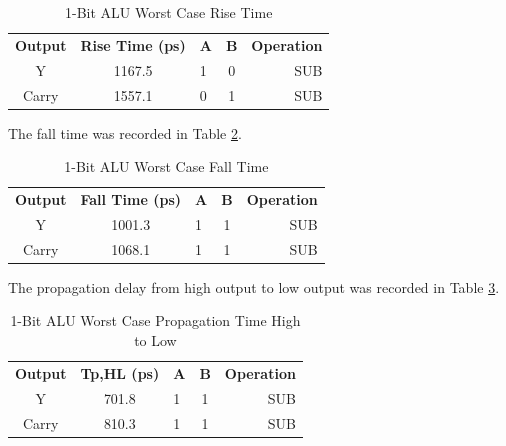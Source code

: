 \documentclass[11pt]{article}
\begin{document}
			\begin{table}[H]
				\centering
				\caption{1-Bit ALU Worst Case Rise Time}
				\label{tab:ALU-1-Bit-Risetime}
				\begin{tabular}{|cclcr|}
					\hline
					\textbf{Output} & \textbf{Rise Time (ps)} & \textbf{A} & \textbf{B} & \textbf{Operation} \\
					Y               & 1167.5                  & 1          & 0          & SUB                \\
					Carry           & 1557.1                  & 0          & 1          & SUB                \\
					         \hline
				\end{tabular}
			\end{table}
		
			The fall time was recorded in Table \ref{tab:ALU-1-Bit-Falltime}.
		
			\begin{table}[H]
				\centering
				\caption{1-Bit ALU Worst Case Fall Time}
				\label{tab:ALU-1-Bit-Falltime}
				\begin{tabular}{|cclcr|}
					\hline
					\textbf{Output} & \textbf{Fall Time (ps)} & \textbf{A} & \textbf{B} & \textbf{Operation} \\
					Y               & 1001.3                  & 1          & 1          & SUB                \\
					Carry           & 1068.1                  & 1          & 1          & SUB                \\
					\hline
				\end{tabular}
			\end{table}
		
			The propagation delay from high output to low output was recorded in Table \ref{tab:ALU-1-Bit-Tpd-HL}.
		
			\begin{table}[H]
				\centering
				\caption{1-Bit ALU Worst Case Propagation Time High to Low}
				\label{tab:ALU-1-Bit-Tpd-HL}
				\begin{tabular}{|cclcr|}
					\hline
					\textbf{Output} & \textbf{Tp,HL (ps)} & \textbf{A} & \textbf{B} & \textbf{Operation} \\
					Y               & 701.8                   & 1          & 1          & SUB                \\
					Carry           & 810.3                   & 1          & 1          & SUB                \\
					\hline
				\end{tabular}
			\end{table}
		
\end{document}

